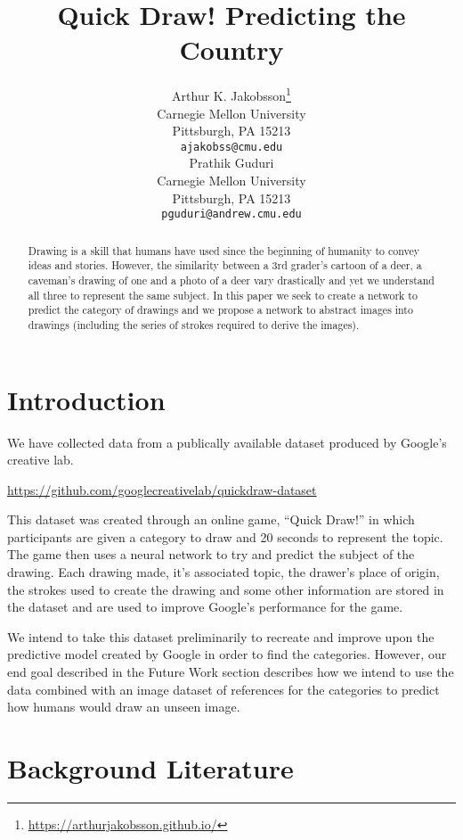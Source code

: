 \documentclass{article}
\title{Quick Draw! Predicting the Country}
\author{
  Arthur K. Jakobsson\thanks{\href{https://arthurjakobsson.github.io/}{https://arthurjakobsson.github.io/}} \\
  Carnegie Mellon University\\
  Pittsburgh, PA 15213 \\
  \texttt{ajakobss@cmu.edu} \\
  \And
  Prathik Guduri \\
  Carnegie Mellon University \\
  Pittsburgh, PA 15213 \\
  \texttt{pguduri@andrew.cmu.edu} \\
}
\begin{document}

\maketitle

\begin{abstract}
  Drawing is a skill that humans have used since the beginning of humanity
  to convey ideas and stories. However, the similarity between a 3rd grader's
  cartoon of a deer, a caveman's drawing of one and a photo of a deer vary
  drastically and yet we understand all three to represent the same subject. In this
  paper we seek to create a network to predict the category of drawings
  and we propose a network to abstract images into drawings (including
  the series of strokes required to derive the images).
\end{abstract}

\section{Introduction}

We have collected data from a publically available dataset produced by Google's
creative lab.
\begin{center}
  \url{https://github.com/googlecreativelab/quickdraw-dataset}
\end{center}

This dataset was created through an online game, ``Quick Draw!'' in which participants
are given a category to draw and 20 seconds to represent the topic. The game
then uses a neural network to try and predict the subject of the drawing. Each
drawing made, it's associated topic, the drawer's place of origin, the strokes
used to create the drawing and some other information are stored in the dataset
and are used to improve Google's performance for the game.

We intend to take this dataset preliminarily to recreate and improve upon
the predictive model created by Google in order to find the categories. However,
our end goal described in the Future Work section describes how we intend
to use the data combined with an image dataset of references for the categories
to predict how humans would draw an unseen image.


\section{Background Literature}
\end{document}
